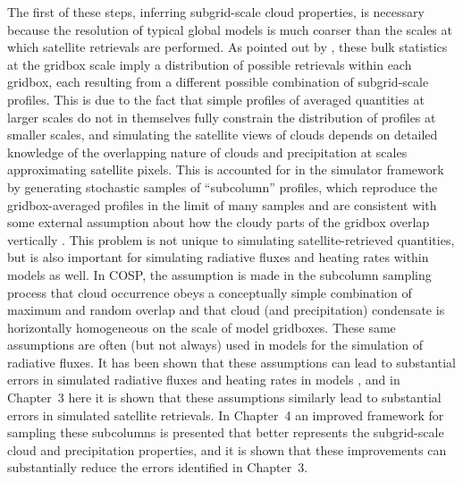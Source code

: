 The first of these steps, inferring subgrid-scale cloud properties, is
necessary because the resolution of typical global models is much
coarser than the scales at which satellite retrievals are performed. As
pointed out by \citet{pincus_et_al_2012}, these bulk statistics at the
gridbox scale imply a distribution of possible retrievals within each
gridbox, each resulting from a different possible combination of
subgrid-scale profiles. This is due to the fact that simple profiles of
averaged quantities at larger scales do not in themselves fully
constrain the distribution of profiles at smaller scales, and simulating
the satellite views of clouds depends on detailed knowledge of the
overlapping nature of clouds and precipitation at scales approximating
satellite pixels. This is accounted for in the simulator framework by
generating stochastic samples of ``subcolumn'' profiles, which reproduce
the gridbox-averaged profiles in the limit of many samples and are
consistent with some external assumption about how the cloudy parts of
the gridbox overlap vertically \citep{klein_and_jakob_1999}. This
problem is not unique to simulating satellite-retrieved quantities, but
is also important for simulating radiative fluxes and heating rates
within models as well. In COSP, the assumption is made in the subcolumn
sampling process that cloud occurrence obeys a conceptually simple
combination of maximum and random overlap and that cloud (and
precipitation) condensate is horizontally homogeneous on the scale of
model gridboxes. These same assumptions are often (but not always) used
in models for the simulation of radiative fluxes. It has been shown that
these assumptions can lead to substantial errors in simulated radiative
fluxes and heating rates in models
\citep{barker_et_al_1999, oreopoulos_et_al_2012}, and in Chapter~3 here
it is shown that these assumptions similarly lead to substantial errors
in simulated satellite retrievals. In Chapter~4 an improved framework
for sampling these subcolumns is presented that better represents the
subgrid-scale cloud and precipitation properties, and it is shown that
these improvements can substantially reduce the errors identified in
Chapter~3.


